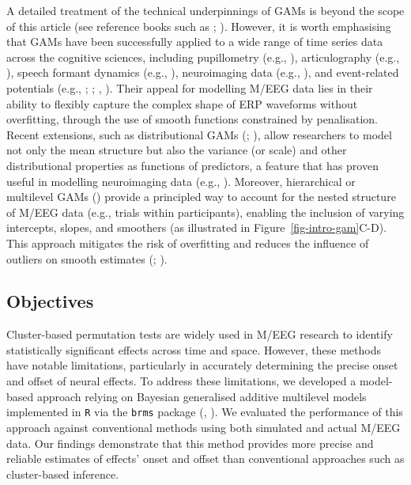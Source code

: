 \documentclass[
  doc,
  floatsintext,
  longtable,
  a4paper,
  nolmodern,
  notxfonts,
  notimes,
  colorlinks=true,linkcolor=blue,citecolor=blue,urlcolor=blue]{apa7}
\begin{document}
A detailed treatment of the technical underpinnings of GAMs is beyond
the scope of this article (see reference books such as
;
). However, it is worth emphasising
that GAMs have been successfully applied to a wide range of time series
data across the cognitive sciences, including pupillometry (e.g.,
), articulography (e.g.,
), speech formant dynamics
(e.g., ), neuroimaging
data (e.g., ), and
event-related potentials (e.g., ; ;
,
). Their appeal for modelling M/EEG data
lies in their ability to flexibly capture the complex shape of ERP
waveforms without overfitting, through the use of smooth functions
constrained by penalisation. Recent extensions, such as distributional
GAMs (;
), allow researchers to
model not only the mean structure but also the variance (or scale) and
other distributional properties as functions of predictors, a feature
that has proven useful in modelling neuroimaging data (e.g.,
). Moreover, hierarchical or
multilevel GAMs () provide a principled way to account for the
nested structure of M/EEG data (e.g., trials within participants),
enabling the inclusion of varying intercepts, slopes, and smoothers (as
illustrated in Figure~\ref{fig-intro-gam}\ignorespaces C-D). This
approach mitigates the risk of overfitting and reduces the influence of
outliers on smooth estimates (; ).

\subsection{Objectives}\label{objectives}

Cluster-based permutation tests are widely used in M/EEG research to
identify statistically significant effects across time and space.
However, these methods have notable limitations, particularly in
accurately determining the precise onset and offset of neural effects.
To address these limitations, we developed a model-based approach
relying on Bayesian generalised additive multilevel models implemented
in \texttt{R} via the \texttt{brms} package
(, ).
We evaluated the performance of this approach against conventional
methods using both simulated and actual M/EEG data. Our findings
demonstrate that this method provides more precise and reliable
estimates of effects' onset and offset than conventional approaches such
as cluster-based inference.
\end{document}
